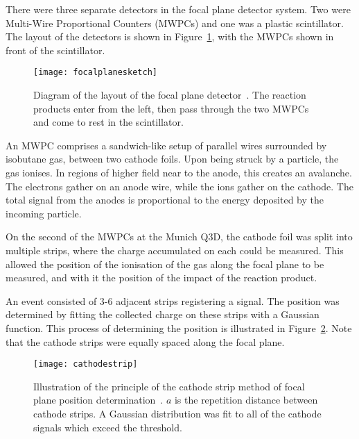 There were three separate detectors in the focal plane detector system. Two were Multi-Wire Proportional Counters (MWPCs) and one was a plastic scintillator. The layout of the detectors is shown in Figure~\ref{detectorSketch}, with the MWPCs shown in front of the scintillator.

\begin{figure}[h]	
\hspace*{-0.5cm}
\begin{center}	
	\texttt{[image: focalplanesketch]}
\end{center}
			\caption[Diagram of the focal plane detector]{Diagram of the layout of the focal plane detector~\cite{gillespie,mllreport}. The reaction products enter from the left, then pass through the two MWPCs and come to rest in the scintillator.}
		\label{detectorSketch}
\end{figure}
\FloatBarrier

An MWPC comprises a sandwich-like setup of parallel wires surrounded by isobutane gas, between two cathode foils. Upon being struck by a particle, the gas ionises. In regions of higher field near to the anode, this creates an avalanche. The electrons gather on an anode wire, while the ions gather on the cathode. The total signal from the anodes is proportional to the energy deposited by the incoming particle.

On the second of the MWPCs at the Munich Q3D, the cathode foil was split into multiple strips, where the charge accumulated on each could be measured. This allowed the position of the ionisation of the gas along the focal plane to be measured, and with it the position of the impact of the reaction product.

An event consisted of 3-6 adjacent strips registering a signal. The position was determined by fitting the collected charge on these strips with a Gaussian function. This process of determining the position is illustrated in Figure~\ref{posCathode}. Note that the cathode strips were equally spaced along the focal plane.

\begin{figure}[h]	
\hspace*{-0.5cm}
\begin{center}	
	\texttt{[image: cathodestrip]}
\end{center}
			\caption[Illustration of the priciple of cathode strip detectors]{Illustration of the principle of the cathode strip method of focal plane position determination~\cite{mllreport}. $a$ is the repetition distance between cathode strips. A Gaussian distribution was fit to all of the cathode signals which exceed the threshold. }
		\label{posCathode}
\end{figure}
\FloatBarrier

